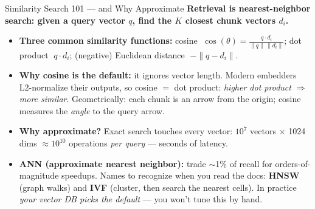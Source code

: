 \begin{frame}{Similarity Search 101 --- and Why Approximate}
\textbf{Retrieval is nearest-neighbor search: given a query vector $q$, find the $K$ closest chunk vectors $d_i$.}

\medskip
\begin{itemize}
\item \textbf{Three common similarity functions:} cosine $\;\cos(\theta) = \frac{q \cdot d_i}{\|q\| \, \|d_i\|}$; \; dot product $\;q \cdot d_i$; \; (negative) Euclidean distance $\;-\|q - d_i\|$.

\medskip
\item \textbf{Why cosine is the default:} it ignores vector length. Modern embedders L2-normalize their outputs, so cosine $=$ dot product: \emph{higher dot product $\Rightarrow$ more similar}. Geometrically: each chunk is an arrow from the origin; cosine measures the \emph{angle} to the query arrow.

\medskip
\item \textbf{Why approximate?} Exact search touches every vector: $10^7$ vectors $\times$ 1024 dims $\approx 10^{10}$ operations \emph{per query} --- seconds of latency.

\medskip
\item \textbf{ANN (approximate nearest neighbor):} trade $\sim$1\% of recall for orders-of-magnitude speedups. Names to recognize when you read the docs: \textbf{HNSW} (graph walks) and \textbf{IVF} (cluster, then search the nearest cells). In practice \emph{your vector DB picks the default} --- you won't tune this by hand.
\end{itemize}
\end{frame}

